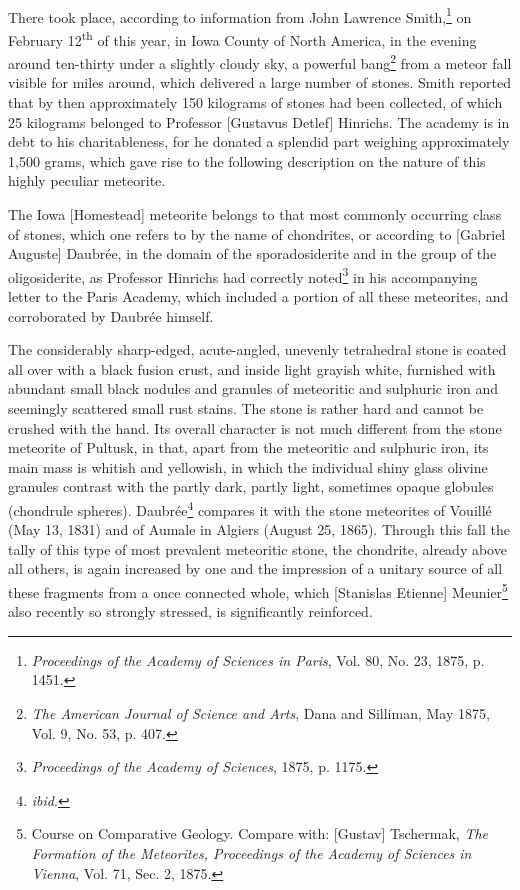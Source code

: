 \documentclass[a4paper, 12pt, oneside]{article}
\begin{document}
\paragraph*{}
There took place, according to information from John Lawrence Smith,\footnote{\emph{Proceedings of the Academy of Sciences in Paris}, Vol. 80, No. 23, 1875, p. 1451.} on February 12\textsuperscript{th} of this year, in Iowa County of North America, in the evening around ten-thirty under a slightly cloudy sky, a powerful bang\footnote{\emph{The American Journal of Science and Arts}, Dana and Silliman, May 1875, Vol. 9, No. 53, p. 407.} from a meteor fall visible for miles around, which delivered a large number of stones. Smith reported that by then approximately 150 kilograms of stones had been collected, of which 25 kilograms belonged to Professor [Gustavus Detlef] Hinrichs. The academy is in debt to his charitableness, for he donated a splendid part weighing approximately 1,500 grams, which gave rise to the following description on the nature of this highly peculiar meteorite.

The Iowa [Homestead] meteorite belongs to that most commonly occurring class of stones, which one refers to by the name of chondrites, or according to [Gabriel Auguste] Daubrée, in the domain of the sporadosiderite and in the group of the oligosiderite, as Professor Hinrichs had correctly noted\footnote{\emph{Proceedings of the Academy of Sciences}, 1875, p. 1175.} in his accompanying letter to the Paris Academy, which included a portion of all these meteorites, and corroborated by Daubrée himself.

The considerably sharp-edged, acute-angled, unevenly tetrahedral stone is coated all over with a black fusion crust, and inside light grayish white, furnished with abundant small black nodules and granules of meteoritic and sulphuric iron and seemingly scattered small rust stains. The stone is rather hard and cannot be crushed with the hand. Its overall character is not much different from the stone meteorite of Pultusk, in that, apart from the meteoritic and sulphuric iron, its main mass is whitish and yellowish, in which the individual shiny glass olivine granules contrast with the partly dark, partly light, sometimes opaque globules (chondrule spheres). Daubrée\footnote{\emph{ibid}.} compares it with the stone meteorites of Vouillé (May 13, 1831) and of Aumale in Algiers (August 25, 1865). Through this fall the tally of this type of most prevalent meteoritic stone, the chondrite, already above all others, is again increased by one and the impression of a unitary source of all these fragments from a once connected whole, which [Stanislas Etienne] Meunier\footnote{Course on Comparative Geology. Compare with: [Gustav] Tschermak, \emph{The Formation of the Meteorites, Proceedings of the Academy of Sciences in Vienna}, Vol. 71, Sec. 2, 1875.} also recently so strongly stressed, is significantly reinforced.
\end{document}
